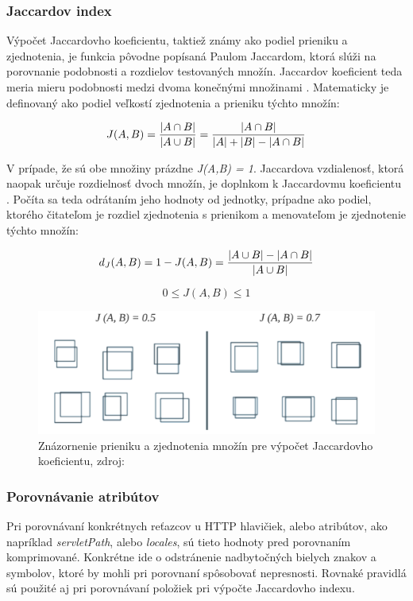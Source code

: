 \documentclass[
  printed, %
  table,   %
  lof,     %
  nolot,   %
  nocover
]{fithesis3}
\begin{document}
\subsubsection{Jaccardov index}
Výpočet Jaccardovho koeficientu, taktiež známy ako podiel prieniku a 
zjednotenia, je funkcia pôvodne popísaná Paulom Jaccardom, ktorá slúži na
porovnanie podobnosti a rozdielov testovaných množín. Jaccardov koeficient teda
meria mieru podobnosti medzi dvoma konečnými množinami \cite{Zezula:2006:SS}. Matematicky je
definovaný ako podiel veľkostí zjednotenia a prieniku týchto množín:

\begin{equation}
 J(A,B) = {{|A \cap B|}\over{|A \cup B|}} = {{|A \cap B|}\over{|A| + |B| - |A \cap B|}}
\end{equation}

V prípade, že sú obe množiny prázdne \textit{J(A,B) = 1}.
Jaccardova vzdialenosť, ktorá naopak určuje rozdielnosť dvoch množín, je
doplnkom k Jaccardovmu koeficientu \cite{Zezula:2006:SS,Kosub:2016:SS}. Počíta sa teda odrátaním jeho hodnoty od
jednotky, prípadne ako podiel, ktorého čitateľom je rozdiel zjednotenia s
prienikom a menovateľom je zjednotenie týchto množín:

\begin{equation}
 d_J(A,B) = 1 - J(A,B) = { { |A \cup B| - |A \cap B| } \over |A \cup B| }
\end{equation}

\begin{equation}
 0\le J(A,B)\le 1
\end{equation}

\begin{figure}[h]
  \centering
    \includegraphics[width=.99\textwidth]{images/footprint-jacc-sets.png}
  \caption{Znázornenie prieniku a zjednotenia množín pre výpočet Jaccardovho
  koeficientu, zdroj: \cite{Zitnick:2014:SS}}
  \label{fig:footprint-jacc-sets}
\end{figure}

\subsubsection{Porovnávanie atribútov}
Pri porovnávaní konkrétnych reťazcov u HTTP hlavičiek, alebo atribútov, ako
napríklad \textit{servletPath}, alebo \textit{locales}, sú tieto hodnoty pred
porovnaním komprimované. Konkrétne ide o odstránenie nadbytočných bielych
znakov a symbolov, ktoré by mohli pri porovnaní spôsobovať nepresnosti. Rovnaké
pravidlá sú použité aj pri porovnávaní položiek pri výpočte Jaccardovho indexu.
\end{document}
